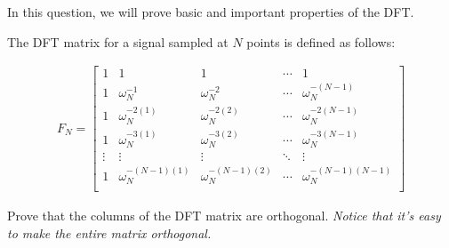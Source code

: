 

In this question, we will prove basic and important properties of the DFT.

The DFT matrix for a signal sampled at $N$ points is defined as follows:

\begin{align*}
F_N =
\begin{bmatrix}
1 & 1 & 1 & \cdots & 1 \\
1 & \omega_N^{-1} & \omega_N^{-2} & \cdots & \omega_N^{-(N-1)} \\
1 & \omega_N^{-2(1)} & \omega_N^{-2(2)} & \cdots & \omega_N^{-2(N-1)} \\
1 & \omega_N^{-3(1)} & \omega_N^{-3(2)} & \cdots & \omega_N^{-3(N-1)} \\
\vdots & \vdots & \vdots  & \ddots & \vdots \\
1 & \omega_N^{-(N-1)(1)} & \omega_N^{-(N-1)(2)} & \cdots & \omega_N^{-(N-1)(N-1)} \\
\end{bmatrix}
\end{align*}

\begin{enumerate}

\qitem
Prove that the columns of the DFT matrix are orthogonal.
{\em
Notice that it's easy to make the entire matrix orthogonal.
}




\end{enumerate}
